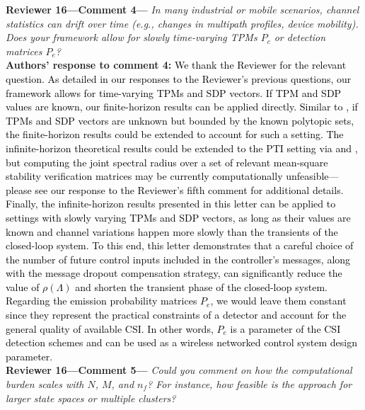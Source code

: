 \begin{bibunit}[alpha]
\textbf{Reviewer 16---Comment 4---}\textit{%
In many industrial or mobile scenarios, channel statistics can drift over time (e.g., changes in multipath profiles, device mobility). 
Does your framework allow for slowly time-varying TPMs $P_c$ or detection matrices $P_e$?}\\[2mm]
\textbf{Authors' response to comment 4:} \textcolor{black}{We thank the Reviewer for the relevant question. As detailed in our responses to the Reviewer's previous questions, our framework allows for time-varying TPMs and SDP vectors. If TPM and SDP values are known, our finite-horizon results can be applied directly. Similar to \cite{zacchialun2025lcss}, if TPMs and SDP vectors are unknown but bounded by the known polytopic sets, the finite-horizon results could be extended to account for such a setting. The infinite-horizon theoretical results could be extended to the PTI setting via \cite{zacchialun2019automatica} and \cite{zacchialun2019ecc}, but computing the joint spectral radius over a set of relevant mean-square stability verification matrices may be currently computationally unfeasible—please see our response to the Reviewer's fifth comment for additional details. 
Finally, the infinite-horizon results presented in this letter can be applied to settings with slowly varying TPMs and SDP vectors, as long as their values are known and channel variations happen more slowly than the transients of the closed-loop system. To this end, this letter demonstrates that a careful choice of the number of future control inputs included in the controller's messages, along with the message dropout compensation strategy, can significantly reduce the value of $\rho(\Lambda)$ and shorten the transient phase of the closed-loop system. Regarding the emission probability matrices $P_e$, we would leave them constant since they represent the practical constraints of a detector and account for the general quality of available CSI. In other words, $P_e$ is a parameter of the CSI detection schemes and can be used as a wireless networked control system design parameter.}\\[4mm]
\textbf{Reviewer 16---Comment 5---}\textit{%
Could you comment on how the computational burden scales with $N$, $M$, and $n_f$? 
For instance, how feasible is the approach for larger state spaces or multiple clusters?}\\[2mm]

\end{bibunit}
